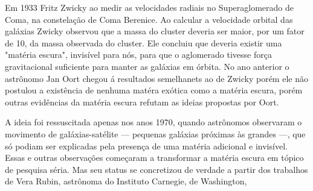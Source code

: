 \documentclass[
	article,			%
	11pt,				%
	oneside,			%
	a4paper,			%
	english,			%
	brazil,				%
	sumario=tradicional
	]{abntex2}
\begin{document}
Em 1933 Fritz Zwicky ao medir as velocidades radiais no Superaglomerado de Coma, na constelação de Coma Berenice. Ao calcular a velocidade orbital das galáxias
Zwicky observou que a massa do cluster deveria ser maior, por um fator de 10, da massa observada do cluster\cite{1933AcHPh...6..110Z}. Ele concluiu que deveria existir uma 
"matéria escura", invisível para nós, para que o aglomerado tivesse força gravitacional suficiente para manter as galáxias em órbita. No ano anterior o astrônomo 
Jan Oort chegou á resultados semelhanets ao de Zwicky porém ele não postulou a existência de nenhuma matéra exótica como a matéria escura, porém outras evidências 
da matéria escura refutam as ideias propostas por Oort.

A ideia foi ressuscitada apenas nos anos 1970,
quando astrônomos observaram o movimento de galáxias-satélite — pequenas
galáxias próximas às grandes —, que só podiam ser explicadas pela presença de
uma
matéria
adicional
e
invisível.
Essas
e
outras
observações
começaram
a
transformar a matéria escura em tópico de pesquisa séria.
Mas seu status se concretizou de verdade a partir dos trabalhos de Vera Rubin,
astrônoma
do
Instituto
Carnegie,
de
Washington,
\end{document}
